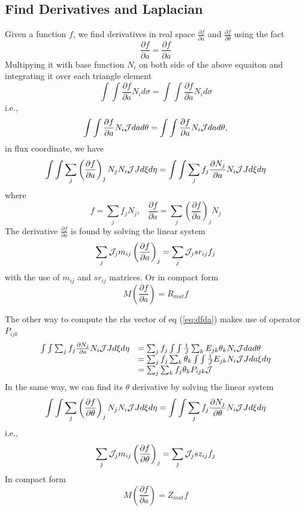 \documentclass{report}
\newcommand{\ff}[2]{\frac{#1}{#2}}
\newcommand{\pp}[2]{\frac{\partial{#1}}{\partial{#2}}}
\begin{document}
\subsection{Find Derivatives and Laplacian}
\label{sec:dadt}
Given a function $f$, we find derivatives in real space 
$\pp{f}{a}$ and $\pp{f}{\theta}$ 
using the fact
$$
\pp{f}{a} = \pp{f}{a}
$$
Multipying it with base function $N_i$ on both side of the above equaiton
and integrating it over each triangle element
$$
\int\int \pp{f}{a} N_i d\sigma = \int\int \pp{f}{a} N_i d\sigma
$$
i.e.,
$$
\int\int \pp{f}{a} N_i {\cal J} dad\theta = \int\int \pp{f}{a} N_i {\cal J}dad\theta,
$$
in flux coordinate, we have  
\begin{equation}
\label{eq:dfda}
\int\int \sum_j \left(\pp{f}{a}\right)_j N_j N_i {\cal J} J d\xi d\eta = 
\int\int \sum_j f_j \pp{N_j}{a} N_i {\cal J} J d\xi d\eta
\end{equation}
where
$$
f=\sum_j f_j N_j,
\;\;\;
\pp{f}{a} = \sum_j \left(\pp{f}{a}\right)_j N_j
$$
The derivative $\pp{f}{a}$ is found by solving the linear system
$$
\sum_j {\cal J}_j m_{ij} \left(\pp{f}{a}\right)_j
= \sum_j {\cal J}_j sr_{ij} f_j
$$
with the use of $m_{ij}$ and $sr_{ij}$ matrices. 
Or in compact form
$$
M \left(\pp{f}{a}\right) = R_{mat} f
$$


The other way to compute the rhs vector of eq (\ref{eq:dfda}) makes use of operator $P_{ijk}$
\begin{equation}
\label{eq:aPijk}
\begin{array}{ll}
\int\int \sum_j f_j \pp{N_j}{a} N_i {\cal J} J d\xi d\eta
& = \sum_j f_j \int\int \ff{1}{J} \sum_k E_{jk} \theta_k N_i {\cal J} dad\theta
\\
& = \sum_j f_j \sum_k \theta_k \int\int \ff{1}{J} E_{jk} N_i {\cal J} J da\xi d\eta \\
& = \sum_j \sum_k f_j \theta_k P_{ijk} {\cal J}
\end{array}
\end{equation}
In the same way, we can find its $\theta$ derivative by solving the linear system
\begin{equation}
\label{eq:dfdt}
\int\int \sum_j \left(\pp{f}{\theta}\right)_j N_j N_i {\cal J} J d\xi d\eta = 
\int\int \sum_j f_j \pp{N_j}{\theta} N_i {\cal J} J d\xi d\eta
\end{equation}
i.e.,
$$
\sum_j {\cal J}_j m_{ij} \left(\pp{f}{\theta}\right)_j
= \sum_j {\cal J}_j sz_{ij} f_j
$$
In compact form
$$
M \left(\pp{f}{a}\right) = Z_{mat} f
$$
\end{document}

